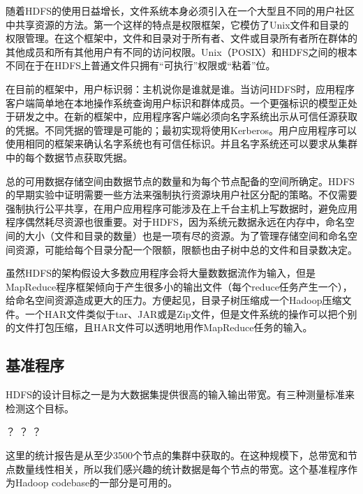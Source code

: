 随着HDFS的使用日益增长，文件系统本身必须引入在一个大型且不同的用户社区中共享资源的方法。第一个这样的特点是权限框架，它模仿了Unix文件和目录的权限管理。在这个框架中，文件和目录对于所有者、文件或目录所有者所在群体的其他成员和所有其他用户有不同的访问权限。Unix（POSIX）和HDFS之间的根本不同在于在HDFS上普通文件只拥有“可执行”权限或“粘着”位。

在目前的框架中，用户标识弱：主机说你是谁就是谁。当访问HDFS时，应用程序客户端简单地在本地操作系统查询用户标识和群体成员。一个更强标识的模型正处于研发之中。在新的框架中，应用程序客户端必须向名字系统出示从可信任源获取的凭据。不同凭据的管理是可能的；最初实现将使用Kerberos。用户应用程序可以使用相同的框架来确认名字系统也有可信任标识。并且名字系统还可以要求从集群中的每个数据节点获取凭据。

总的可用数据存储空间由数据节点的数量和为每个节点配备的空间所确定。HDFS的早期实验中证明需要一些方法来强制执行资源块用户社区分配的策略。不仅需要强制执行公平共享，在用户应用程序可能涉及在上千台主机上写数据时，避免应用程序偶然耗尽资源也很重要。对于HDFS，因为系统元数据永远在内存中，命名空间的大小（文件和目录的数量）也是一项有尽的资源。为了管理存储空间和命名空间资源，可能给每个目录分配一个限额，限额也由子树中总的文件和目录数决定。

虽然HDFS的架构假设大多数应用程序会将大量数数据流作为输入，但是MapReduce程序框架倾向于产生很多小的输出文件（每个reduce任务产生一个），给命名空间资源造成更大的压力。方便起见，目录子树压缩成一个Hadoop压缩文件。一个HAR文件类似于tar、JAR或是Zip文件，但是文件系统的操作可以把个别的文件打包压缩，且HAR文件可以透明地用作MapReduce任务的输入。

\subsection{基准程序}

HDFS的设计目标之一是为大数据集提供很高的输入输出带宽。有三种测量标准来检测这个目标。
\begin{itemize}
？
？
？
\end{itemize}
这里的统计报告是从至少3500个节点的集群中获取的。在这种规模下，总带宽和节点数量线性相关，所以我们感兴趣的统计数据是每个节点的带宽。这个基准程序作为Hadoop codebase的一部分是可用的。


